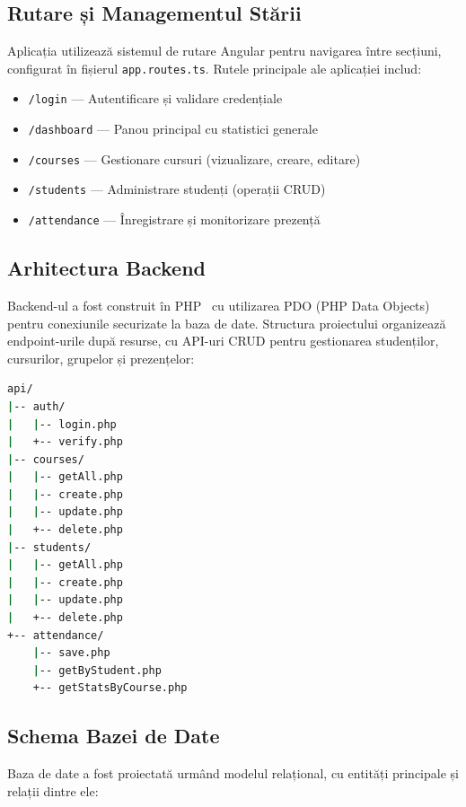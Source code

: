 \documentclass[conference]{IEEEtran}
\begin{document}
\subsection{Rutare și Managementul Stării}

Aplicația utilizează sistemul de rutare Angular pentru navigarea între
secțiuni, configurat în fișierul \texttt{app.routes.ts}. Rutele principale ale
aplicației includ:

\begin{itemize}
    \item \texttt{/login} --- Autentificare și validare credențiale
    \item \texttt{/dashboard} --- Panou principal cu statistici generale
    \item \texttt{/courses} --- Gestionare cursuri (vizualizare, creare, editare)
    \item \texttt{/students} --- Administrare studenți (operații CRUD)
    \item \texttt{/attendance} --- Înregistrare și monitorizare prezență
\end{itemize}

\subsection{Arhitectura Backend}

Backend-ul a fost construit în PHP~\cite{PHP2024} cu utilizarea PDO (PHP Data
Objects) pentru conexiunile securizate la baza de date. Structura proiectului
organizează endpoint-urile după resurse, cu API-uri CRUD pentru gestionarea
studenților, cursurilor, grupelor și prezențelor:

\begin{lstlisting}[language=bash]
api/
|-- auth/
|   |-- login.php
|   +-- verify.php
|-- courses/
|   |-- getAll.php
|   |-- create.php
|   |-- update.php
|   +-- delete.php
|-- students/
|   |-- getAll.php
|   |-- create.php
|   |-- update.php
|   +-- delete.php
+-- attendance/
    |-- save.php
    |-- getByStudent.php
    +-- getStatsByCourse.php
\end{lstlisting}

\subsection{Schema Bazei de Date}

Baza de date a fost proiectată urmând modelul relațional, cu entități
principale și relații dintre ele:
\end{document}
